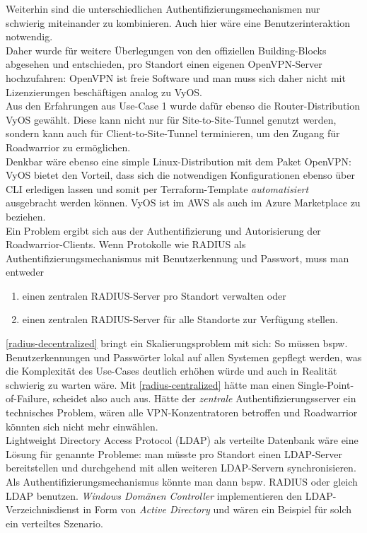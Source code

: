 Weiterhin sind die unterschiedlichen Authentifizierungsmechanismen nur schwierig miteinander zu kombinieren. Auch hier wäre eine Benutzerinteraktion notwendig.\\
Daher wurde für weitere Überlegungen von den offiziellen Building-Blocks abgesehen und entschieden, pro Standort einen eigenen OpenVPN-Server hochzufahren: OpenVPN ist freie Software und man muss sich daher nicht mit Lizenzierungen beschäftigen analog zu VyOS.\\
Aus den Erfahrungen aus Use-Case 1 wurde dafür ebenso die Router-Distribution VyOS gewählt. Diese kann nicht nur für \gls{Site-to-Site}-Tunnel genutzt werden, sondern kann auch für \gls{Client-to-Site}-Tunnel terminieren, um den Zugang für \gls{Roadwarrior} zu ermöglichen.\\
Denkbar wäre ebenso eine simple Linux-Distribution mit dem Paket OpenVPN: VyOS bietet den Vorteil, dass sich die notwendigen Konfigurationen ebenso über CLI erledigen lassen und somit per Terraform-Template \textit{automatisiert} ausgebracht werden können\cite{vyosopenvpn2021}. VyOS ist im AWS als auch im Azure Marketplace zu beziehen.\\
Ein Problem ergibt sich aus der Authentifizierung und Autorisierung der \gls{Roadwarrior}-\gls{Client}s. Wenn Protokolle wie RADIUS\cite{rfc2865} als Authentifizierungsmechanismus mit Benutzerkennung und Passwort, muss man entweder
\begin{enumerate}[label=(\alph*)]
\item \label{radius-decentralized} einen zentralen RADIUS-Server pro Standort verwalten oder
\item \label{radius-centralized} einen zentralen RADIUS-Server für alle Standorte zur Verfügung stellen.
\end{enumerate}
\ref{radius-decentralized} bringt ein Skalierungsproblem mit sich: So müssen bspw. Benutzerkennungen und Passwörter lokal auf allen Systemen gepflegt werden, was die Komplexität des Use-Cases deutlich erhöhen würde und auch in Realität schwierig zu warten wäre. Mit \ref{radius-centralized} hätte man einen Single-Point-of-Failure, scheidet also auch aus. Hätte der \textit{zentrale} Authentifizierungsserver ein technisches Problem, wären alle \gls{VPN-Konzentrator}en betroffen und \gls{Roadwarrior} könnten sich nicht mehr einwählen.\\
Lightweight Directory Access Protocol (LDAP)\cite{rfc4511} als verteilte Datenbank wäre eine Lösung für genannte Probleme: man müsste pro Standort einen LDAP-Server bereitstellen und durchgehend mit allen weiteren LDAP-Servern synchronisieren. Als Authentifizierungsmechanismus könnte man dann bspw. RADIUS\cite{rfc2865} oder gleich LDAP benutzen. \textit{Windows Domänen Controller} implementieren den LDAP-Verzeichnisdienst in Form von \textit{Active Directory} und wären ein Beispiel für solch ein verteiltes Szenario.\cite[S.603-604]{Tanenbaum2003}\\
